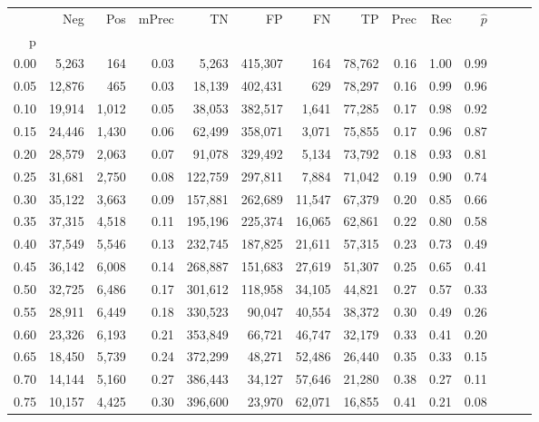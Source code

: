 \begin{tabular}{rrrrrrrrrrrrrr}
\toprule
{} &     Neg &    Pos & mPrec &       TN &       FP &      FN &      TP &  Prec &   Rec & $\hat{p}$ \\
p    &         &        &       &          &          &         &         &       &       &           \\
\midrule
0.00 &   5,263 &    164 &  0.03 &    5,263 &  415,307 &     164 &  78,762 &  0.16 &  1.00 &      0.99 \\
0.05 &  12,876 &    465 &  0.03 &   18,139 &  402,431 &     629 &  78,297 &  0.16 &  0.99 &      0.96 \\
0.10 &  19,914 &  1,012 &  0.05 &   38,053 &  382,517 &   1,641 &  77,285 &  0.17 &  0.98 &      0.92 \\
0.15 &  24,446 &  1,430 &  0.06 &   62,499 &  358,071 &   3,071 &  75,855 &  0.17 &  0.96 &      0.87 \\
0.20 &  28,579 &  2,063 &  0.07 &   91,078 &  329,492 &   5,134 &  73,792 &  0.18 &  0.93 &      0.81 \\
0.25 &  31,681 &  2,750 &  0.08 &  122,759 &  297,811 &   7,884 &  71,042 &  0.19 &  0.90 &      0.74 \\
0.30 &  35,122 &  3,663 &  0.09 &  157,881 &  262,689 &  11,547 &  67,379 &  0.20 &  0.85 &      0.66 \\
0.35 &  37,315 &  4,518 &  0.11 &  195,196 &  225,374 &  16,065 &  62,861 &  0.22 &  0.80 &      0.58 \\
0.40 &  37,549 &  5,546 &  0.13 &  232,745 &  187,825 &  21,611 &  57,315 &  0.23 &  0.73 &      0.49 \\
0.45 &  36,142 &  6,008 &  0.14 &  268,887 &  151,683 &  27,619 &  51,307 &  0.25 &  0.65 &      0.41 \\
0.50 &  32,725 &  6,486 &  0.17 &  301,612 &  118,958 &  34,105 &  44,821 &  0.27 &  0.57 &      0.33 \\
0.55 &  28,911 &  6,449 &  0.18 &  330,523 &   90,047 &  40,554 &  38,372 &  0.30 &  0.49 &      0.26 \\
0.60 &  23,326 &  6,193 &  0.21 &  353,849 &   66,721 &  46,747 &  32,179 &  0.33 &  0.41 &      0.20 \\
0.65 &  18,450 &  5,739 &  0.24 &  372,299 &   48,271 &  52,486 &  26,440 &  0.35 &  0.33 &      0.15 \\
0.70 &  14,144 &  5,160 &  0.27 &  386,443 &   34,127 &  57,646 &  21,280 &  0.38 &  0.27 &      0.11 \\
0.75 &  10,157 &  4,425 &  0.30 &  396,600 &   23,970 &  62,071 &  16,855 &  0.41 &  0.21 &      0.08 \\

\end{tabular}
